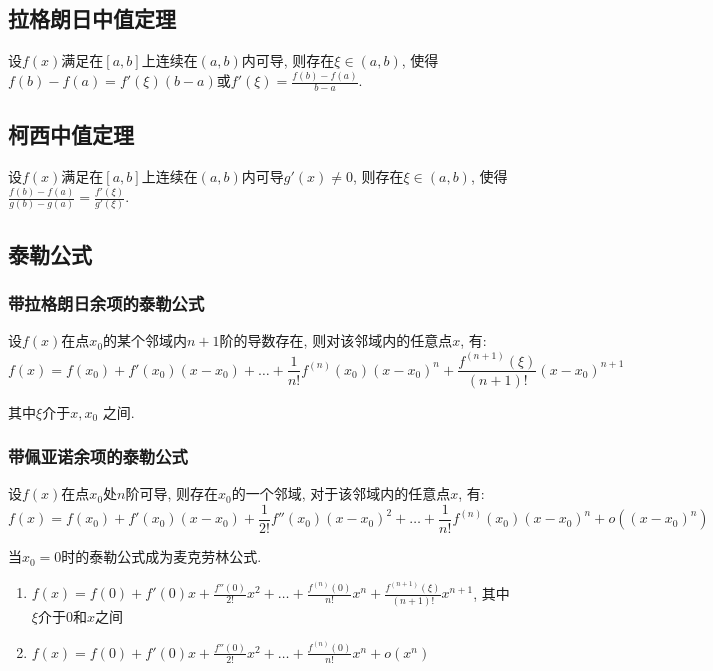 \subsection{拉格朗日中值定理}
设$ f(x) $满足在$ [a,b] $上连续在$ (a,b) $内可导, 则存在$ \xi\in(a,b) $, 使得$ f(b)-f(a)=f'(\xi)(b-a) $或$ f'(\xi)=\frac{f(b)-f(a)}{b-a} $.
\subsection{柯西中值定理}
设$ f(x) $满足在$ [a,b] $上连续在$ (a,b) $内可导$ g'(x)\neq 0 $, 则存在$ \xi\in(a,b) $, 使得$ \frac{f(b)-f(a)}{g(b)-g(a)}=\frac{f'(\xi)}{g'(\xi)} $.
\subsection{泰勒公式}
\subsubsection{带拉格朗日余项的泰勒公式}
设$ f(x) $在点$ x_{0} $的某个邻域内$ n+1 $阶的导数存在, 则对该邻域内的任意点$ x $, 有:
\begin{equation*}
f(x)=f(x_{0})+f'(x_{0})(x-x_{0})+\dots+\frac{1}{n!}f^{(n)}(x_{0})(x-x_{0})^{n}+\frac{f^{(n+1)}(\xi)}{(n+1)!}(x-x_{0})^{n+1}
\end{equation*}\par 
其中$ \xi $介于$ x,x_{0} $ 之间.
\subsubsection{带佩亚诺余项的泰勒公式}
设$ f(x) $在点$ x_{0} $处$ n $阶可导, 则存在$ x_{0} $的一个邻域, 对于该邻域内的任意点$ x $, 有:
\begin{equation*}
f(x)=f(x_{0})+f'(x_{0})(x-x_{0})+\frac{1}{2!}f''(x_{0})(x-x_{0})^{2}+\dots+\frac{1}{n!}f^{(n)}(x_{0})(x-x_{0})^{n}+o((x-x_{0})^{n})
\end{equation*}
\begin{tcolorbox}
当$ x_{0}=0 $时的泰勒公式成为麦克劳林公式.
\begin{enumerate}
\item $ f(x)=f(0)+f'(0)x+\frac{f''(0)}{2!}x^{2}+\dots+\frac{f^{(n)}(0)}{n!}x^{n}+\frac{f^{(n+1)}(\xi)}{(n+1)!}x^{n+1} $, 其中$ \xi $介于$ 0 $和$ x $之间
\item $ f(x)=f(0)+f'(0)x+\frac{f''(0)}{2!}x^{2}+\dots+\frac{f^{(n)}(0)}{n!}x^{n}+o(x^{n}) $
\end{enumerate}
\end{tcolorbox}
